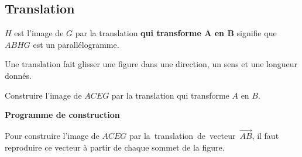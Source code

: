 \subsection{Translation}
\begin{minipage}{0.6\linewidth}
    \begin{definition}
        $H$ est l’image de $G$ par la translation \textbf{qui transforme $\mathbf{A}$ en $\mathbf{B}$} signifie que $ABHG$ est un parallélogramme.
    \end{definition}
\end{minipage}
\begin{minipage}{0.4\linewidth}
    \hspace*{-10mm}
\end{minipage}

\begin{remarque}
    Une translation fait glisser une figure dans une direction, un sens et une longueur donnés.
    \begin{myBox}{}
    \end{myBox}
\end{remarque}

\begin{methode*1}    
    \exercice
    Construire l'image de $ACEG$ par la translation qui transforme $A$ en $B$.
    \correction
    \begin{minipage}{0.45\linewidth}
        \begin{center}
        \end{center}
    \end{minipage}
    \begin{minipage}{0.55\linewidth}
        \textbf{Programme de construction}

        Pour construire l'image de $ACEG$ par \mbox{la translation de vecteur $\overrightarrow{AB}$}, il faut reproduire ce vecteur à partir de chaque sommet de la figure.
    \end{minipage}
    \begin{myBox}{}
        \creditInstrumentPoche
    \end{myBox}
\end{methode*1}
